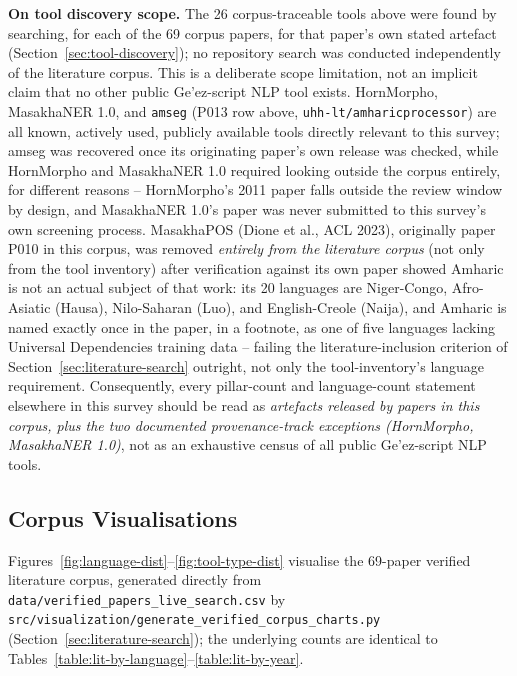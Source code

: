 \documentclass[sn-mathphys-num]{sn-jnl}
\theoremstyle{thmstyleone}
\theoremstyle{thmstyletwo}
\theoremstyle{thmstylethree}
\begin{document}
\textbf{On tool discovery scope.}\label{sec:tool-discovery-scope-note} The 26 corpus-traceable tools above were found by searching, for each of the 69 corpus papers, for that paper's own stated artefact (Section~\ref{sec:tool-discovery}); no repository search was conducted independently of the literature corpus. This is a deliberate scope limitation, not an implicit claim that no other public Ge'ez-script NLP tool exists. HornMorpho, MasakhaNER 1.0, and \texttt{amseg} (P013 row above, \texttt{uhh-lt/amharicprocessor}) are all known, actively used, publicly available tools directly relevant to this survey; amseg was recovered once its originating paper's own release was checked, while HornMorpho and MasakhaNER 1.0 required looking outside the corpus entirely, for different reasons -- HornMorpho's 2011 paper falls outside the review window by design, and MasakhaNER 1.0's paper was never submitted to this survey's own screening process. MasakhaPOS (Dione et al., ACL 2023), originally paper P010 in this corpus, was removed \emph{entirely from the literature corpus} (not only from the tool inventory) after verification against its own paper showed Amharic is not an actual subject of that work: its 20 languages are Niger-Congo, Afro-Asiatic (Hausa), Nilo-Saharan (Luo), and English-Creole (Naija), and Amharic is named exactly once in the paper, in a footnote, as one of five languages lacking Universal Dependencies training data -- failing the literature-inclusion criterion of Section~\ref{sec:literature-search} outright, not only the tool-inventory's language requirement. Consequently, every pillar-count and language-count statement elsewhere in this survey should be read as \emph{artefacts released by papers in this corpus, plus the two documented provenance-track exceptions (HornMorpho, MasakhaNER 1.0)}, not as an exhaustive census of all public Ge'ez-script NLP tools.

\subsection{Corpus Visualisations}\label{sec:corpus-figures}

Figures~\ref{fig:language-dist}--\ref{fig:tool-type-dist} visualise the 69-paper verified literature corpus, generated directly from \texttt{data/verified\_papers\_live\_search.csv} by \texttt{src/visualization/generate\_verified\_corpus\_charts.py} (Section~\ref{sec:literature-search}); the underlying counts are identical to Tables~\ref{table:lit-by-language}--\ref{table:lit-by-year}.
\end{document}
